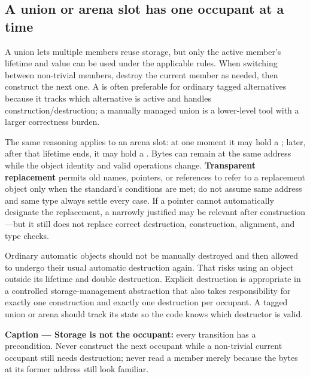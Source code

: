 \subsection{A union or arena slot has one occupant at a time}\label{01-foundations-i-ch004-a-union-or-arena-slot-has-one-occupant-at-a-time}

\hypertarget{01-foundations-i-ch004-a-union-or-arena-slot-has-one-occupant-at-a-time}{}

A union lets multiple members reuse storage, but only the active member's lifetime and value can be used under the applicable rules. When switching between non-trivial members, destroy the current member as needed, then construct the next one. A  is often preferable for ordinary tagged alternatives because it tracks which alternative is active and handles construction/destruction; a manually managed union is a lower-level tool with a larger correctness burden.

The same reasoning applies to an arena slot: at one moment it may hold a ; later, after that lifetime ends, it may hold a . Bytes can remain at the same address while the object identity and valid operations change. \textbf{Transparent replacement} permits old names, pointers, or references to refer to a replacement object only when the standard's conditions are met; do not assume same address and same type always settle every case. If a pointer cannot automatically designate the replacement, a narrowly justified  may be relevant after construction---but it still does not replace correct destruction, construction, alignment, and type checks.

Ordinary automatic objects should not be manually destroyed and then allowed to undergo their usual automatic destruction again. That risks using an object outside its lifetime and double destruction. Explicit destruction is appropriate in a controlled storage-management abstraction that also takes responsibility for exactly one construction and exactly one destruction per occupant. A tagged union or arena should track its state so the code knows which destructor is valid.


\textbf{Caption --- Storage is not the occupant:} every transition has a precondition. Never construct the next occupant while a non-trivial current occupant still needs destruction; never read a member merely because the bytes at its former address still look familiar.

